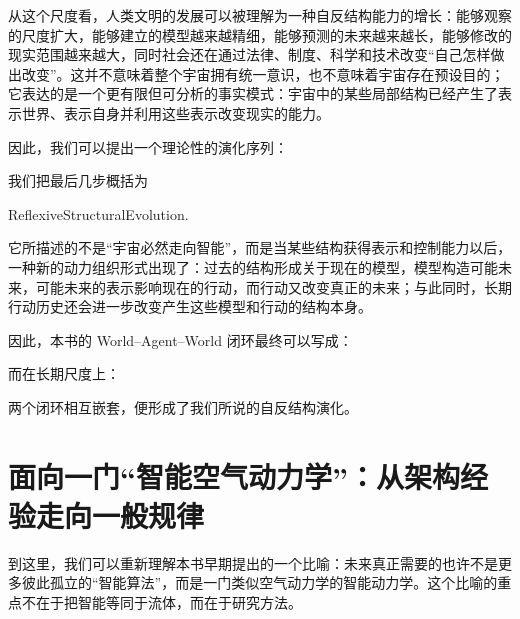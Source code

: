 从这个尺度看，人类文明的发展可以被理解为一种自反结构能力的增长：能够观察的尺度扩大，能够建立的模型越来越精细，能够预测的未来越来越长，能够修改的现实范围越来越大，同时社会还在通过法律、制度、科学和技术改变“自己怎样做出改变”。这并不意味着整个宇宙拥有统一意识，也不意味着宇宙存在预设目的；它表达的是一个更有限但可分析的事实模式：宇宙中的某些局部结构已经产生了表示世界、表示自身并利用这些表示改变现实的能力。

因此，我们可以提出一个理论性的演化序列：
\begin{statementbox}
\centering
{}
\end{statementbox}

我们把最后几步概括为
\begin{statementbox}
ReflexiveStructuralEvolution.
\end{statementbox}

它所描述的不是“宇宙必然走向智能”，而是当某些结构获得表示和控制能力以后，一种新的动力组织形式出现了：过去的结构形成关于现在的模型，模型构造可能未来，可能未来的表示影响现在的行动，而行动又改变真正的未来；与此同时，长期行动历史还会进一步改变产生这些模型和行动的结构本身。

因此，本书的 World--Agent--World 闭环最终可以写成：
\begin{statementbox}
\centering
{}
\end{statementbox}
而在长期尺度上：
\begin{statementbox}
\centering
{}
\end{statementbox}

两个闭环相互嵌套，便形成了我们所说的自反结构演化。

\section{面向一门“智能空气动力学”：从架构经验走向一般规律}

到这里，我们可以重新理解本书早期提出的一个比喻：未来真正需要的也许不是更多彼此孤立的“智能算法”，而是一门类似空气动力学的智能动力学。这个比喻的重点不在于把智能等同于流体，而在于研究方法。

